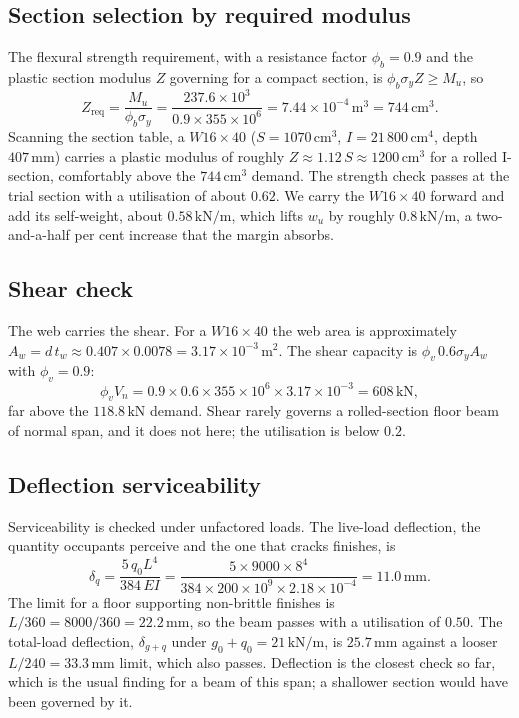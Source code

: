 \subsection{Section selection by required modulus}

The flexural strength requirement, with a resistance factor $\phi_b =
0.9$ and the plastic section modulus $Z$ governing for a compact
section, is $\phi_b \sigma_y Z \geq M_u$, so
\[
Z_{\text{req}} = \frac{M_u}{\phi_b \sigma_y}
= \frac{237.6 \times 10^3}{0.9 \times 355 \times 10^6}
= 7.44 \times 10^{-4}\,\si{\meter\cubed} = 744\,\text{cm}^3.
\]
Scanning the section table, a $W16\times 40$ ($S = 1070\,\text{cm}^3$,
$I = 21\,800\,\text{cm}^4$, depth $407\,\si{\milli\meter}$) carries a
plastic modulus of roughly $Z \approx 1.12\,S \approx 1200\,\text{cm}^3$
for a rolled I-section, comfortably above the $744\,\text{cm}^3$ demand.
The strength check passes at the trial section with a utilisation of
about $0.62$. We carry the $W16\times 40$ forward and add its
self-weight, about $0.58\,\text{kN}/\text{m}$, which lifts $w_u$ by
roughly $0.8\,\text{kN}/\text{m}$, a two-and-a-half per cent increase
that the margin absorbs.

\subsection{Shear check}

The web carries the shear. For a $W16\times 40$ the web area is
approximately $A_w = d\,t_w \approx 0.407 \times 0.0078 = 3.17 \times
10^{-3}\,\si{\meter\squared}$. The shear capacity is $\phi_v\,0.6
\sigma_y A_w$ with $\phi_v = 0.9$:
\[
\phi_v V_n = 0.9 \times 0.6 \times 355 \times 10^6 \times 3.17 \times
10^{-3} = 608\,\text{kN},
\]
far above the $118.8\,\text{kN}$ demand. Shear rarely governs a
rolled-section floor beam of normal span, and it does not here; the
utilisation is below $0.2$.

\subsection{Deflection serviceability}

Serviceability is checked under unfactored loads. The live-load
deflection, the quantity occupants perceive and the one that cracks
finishes, is
\[
\delta_{q} = \frac{5\,q_0 L^4}{384\,E I}
= \frac{5 \times 9000 \times 8^4}{384 \times 200 \times 10^9 \times
2.18 \times 10^{-4}}
= 11.0\,\si{\milli\meter}.
\]
The limit for a floor supporting non-brittle finishes is $L/360 =
8000/360 = 22.2\,\si{\milli\meter}$, so the beam passes with a
utilisation of $0.50$. The total-load deflection, $\delta_{g+q}$ under
$g_0 + q_0 = 21\,\text{kN}/\text{m}$, is $25.7\,\si{\milli\meter}$
against a looser $L/240 = 33.3\,\si{\milli\meter}$ limit, which also
passes. Deflection is the closest check so far, which is the usual
finding for a beam of this span; a shallower section would have been
governed by it.

